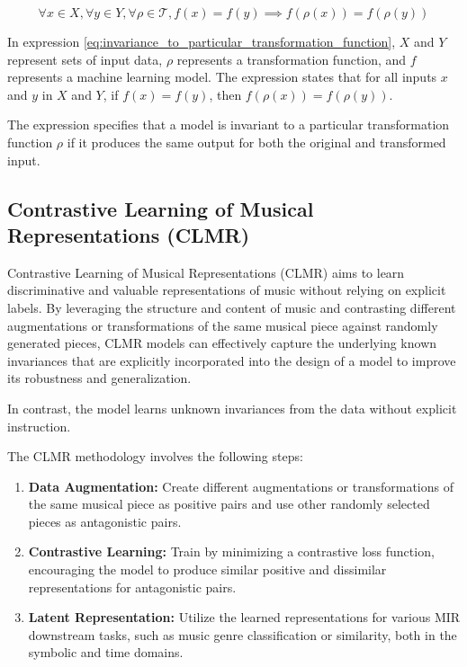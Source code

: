 \begin{equation}
\label{eq:invariance_to_particular_transformation_function}
\forall x \in X, \forall y \in Y, \forall \rho \in \mathcal{T}, f(x) = f(y) \implies f(\rho(x)) = f(\rho(y))
\end{equation}

In expression \ref{eq:invariance_to_particular_transformation_function}, $X$ and $Y$ represent sets of input data, $\rho$ represents a transformation function, and $f$ represents a machine learning model. The expression states that for all inputs $x$ and $y$ in $X$ and $Y$, if $f(x) = f(y)$, then $f(\rho(x)) = f(\rho(y))$.

The expression specifies that a model is invariant to a particular transformation function $\rho$ if it produces the same output for both the original and transformed input.


\subsection{Contrastive Learning of Musical Representations (CLMR)}

Contrastive Learning of Musical Representations (CLMR) \cite{CLMR2021} aims to learn discriminative and valuable representations of music without relying on explicit labels. By leveraging the structure and content of music and contrasting different augmentations or transformations of the same musical piece against randomly generated pieces, CLMR models can effectively capture the underlying known invariances that are explicitly incorporated into the design of a model to improve its robustness and generalization. 

In contrast, the model learns unknown invariances from the data without explicit instruction.

The CLMR methodology involves the following steps:

\begin{enumerate}
\item \textbf{Data Augmentation:} Create different augmentations or transformations of the same musical piece as positive pairs and use other randomly selected pieces as antagonistic pairs.
\item \textbf{Contrastive Learning:} Train by minimizing a contrastive loss function, encouraging the model to produce similar positive and dissimilar representations for antagonistic pairs.
\item\textbf{Latent Representation:} Utilize the learned representations for various MIR downstream tasks, such as music genre classification or similarity, both in the symbolic and time domains.
\end{enumerate} 


